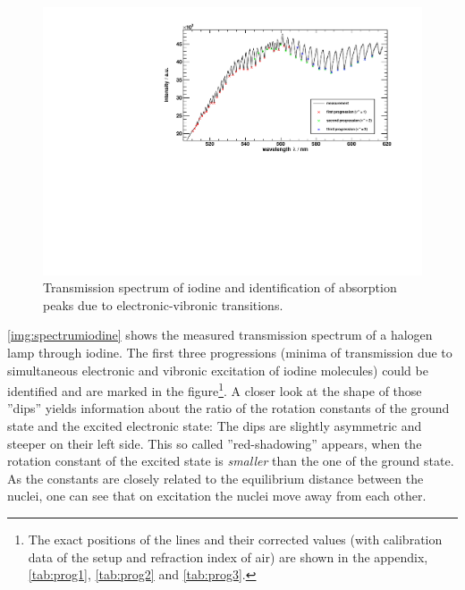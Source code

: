 \begin{figure}[H]
\begin{center}
  \includegraphics[width=\textwidth]{../img/I2_absorption.pdf}
  \caption[---]{Transmission spectrum of iodine and identification of absorption peaks due
  to electronic-vibronic transitions.}
  \label{img:spectrumiodine}
\end{center}
\end{figure}

\autoref{img:spectrumiodine} shows the measured transmission spectrum of a halogen lamp through iodine.
The first three progressions
(minima of transmission due to simultaneous electronic and vibronic excitation of iodine molecules)
could be identified and are marked in the
figure\footnote{The exact positions of the lines and
their corrected values (with calibration data of the setup and refraction index of air)
are shown in the appendix, \autoref{tab:prog1}, \autoref{tab:prog2} and \autoref{tab:prog3}.}.
A closer look at the shape of those ''dips'' yields information about the ratio of the rotation constants
of the ground state and the excited electronic state:
The dips are slightly asymmetric and steeper on their left side. This so called
''red-shadowing'' appears, when the rotation constant of the excited state is \emph{smaller} than
the one of the ground state. As the constants are closely related to the equilibrium distance between the nuclei,
one can see that on excitation the nuclei move away from each other.




